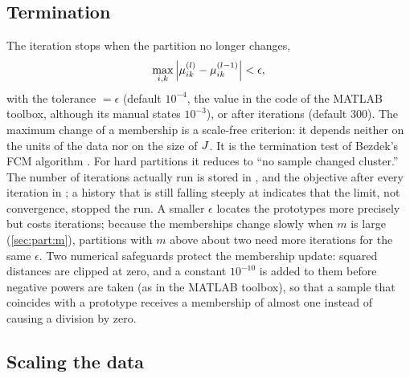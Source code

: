 \subsection{Termination}\label{sec:found:stop}

The iteration stops when the partition no longer changes,
\begin{equation}
  \max_{i,k}\left\lvert \mu^{(l)}_{ik}-\mu^{(l-1)}_{ik} \right\rvert<\epsilon,
  \label{eq:found:stop}
\end{equation}
with the tolerance $=\epsilon$ (default $10^{-4}$, the value in the code of the MATLAB toolbox, although its manual states $10^{-3}$), or after  iterations (default 300). The maximum change of a membership is a scale-free criterion: it depends neither on the units of the data nor on the size of $J$. It is the termination test of Bezdek's FCM algorithm \cite{bezdek:1981,bezdek:1984:fcm}. For hard partitions it reduces to ``no sample changed cluster.'' The number of iterations actually run is stored in , and the objective after every iteration in ; a history that is still falling steeply at  indicates that the limit, not convergence, stopped the run. A smaller $\epsilon$ locates the prototypes more precisely but costs iterations; because the memberships change slowly when $m$ is large (\cref{sec:part:m}), partitions with $m$ above about two need more iterations for the same $\epsilon$. Two numerical safeguards protect the membership update: squared distances are clipped at zero, and a constant $10^{-10}$ is added to them before negative powers are taken (as in the MATLAB toolbox), so that a sample that coincides with a prototype receives a membership of almost one instead of causing a division by zero.

\subsection{Scaling the data}\label{sec:found:scaling}

